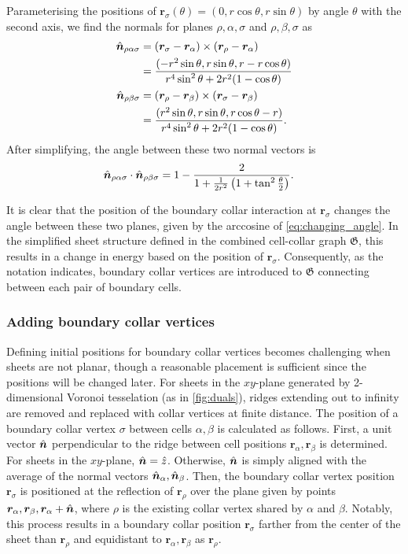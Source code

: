 Parameterising the positions of $\bm{r}_\sigma(\theta) = (0, r\cos\theta, r\sin\theta)$ by angle $\theta$ with the second axis, we find the normals for planes $\rho, \alpha, \sigma$ and $\rho, \beta, \sigma$ as 
\begin{align*}
	\hat{\bm{n}}_{\rho\alpha\sigma} &= (\bm{r}_\sigma - \bm{r}_\alpha) \times (\bm{r}_\rho - \bm{r}_\alpha) \\
	&= \frac{(-r^2 \sin\theta, r\sin\theta, r - r\cos\theta)}{r^4\sin^2\theta + 2r^2(1-\cos\theta)} \\
	\hat{\bm{n}}_{\rho\beta\sigma} &= (\bm{r}_{\rho} - \bm{r}_\beta) \times (\bm{r}_\sigma - \bm{r}_\beta)\\
	&= \frac{(r^2 \sin\theta, r\sin\theta, r\cos\theta - r)}{r^4\sin^2\theta + 2r^2(1-\cos\theta)}.
\end{align*}
\noindent After simplifying, the angle between these two normal vectors is 
\begin{align}
	\hat{\bm{n}}_{\rho\alpha\sigma} \cdot \hat{\bm{n}}_{\rho\beta\sigma} &= 1 - \frac{2}{1 + \frac{1}{2r^2} \left( 1 + \tan^2 \frac{\theta}{2}\right)}. \label{eq:changing_angle}
\end{align}

It is clear that the position of the boundary collar interaction at $\bm{r}_\sigma$ changes the angle between these two planes, given by the arccosine of \cref{eq:changing_angle}. 
In the simplified sheet structure defined in the combined cell-collar graph $\mathfrak{G}$, this results in a change in energy based on the position of $\bm{r}_\sigma$. 
Consequently, as the notation indicates, boundary collar vertices are introduced to $\mathfrak{G}$ connecting between each pair of boundary cells.

\subsubsection{Adding boundary collar vertices}

Defining initial positions for boundary collar vertices becomes challenging when sheets are not planar, though a reasonable placement is sufficient since the positions will be changed later. 
For sheets in the $xy$-plane generated by 2-dimensional Voronoi tesselation (as in \cref{fig:duals}), ridges extending out to infinity are removed and replaced with collar vertices at finite distance. 
The position of a boundary collar vertex $\sigma$ between cells $\alpha, \beta$ is calculated as follows. 
First, a unit vector $\hat{\bm{n}}$ perpendicular to the ridge between cell positions $\bm{r}_\alpha, \bm{r}_\beta$ is determined. 
For sheets in the $xy$-plane, $\hat{\bm{n}}=\hat{z}$. 
Otherwise, $\hat{\bm{n}}$ is simply aligned with the average of the normal vectors $\hat{\bm{n}}_\alpha, \hat{\bm{n}}_\beta$.
Then, the boundary collar vertex position $\bm{r}_\sigma$ is positioned at the reflection of $\bm{r}_\rho$ over the plane given by points $\bm{r}_\alpha, \bm{r}_\beta, \bm{r}_\alpha + \hat{\bm{n}}$, where $\rho$ is the existing collar vertex shared by $\alpha$ and $\beta$.
Notably, this process results in a boundary collar position $\bm{r}_\sigma$ farther from the center of the sheet than $\bm{r}_\rho$ and equidistant to $\bm{r}_\alpha, \bm{r}_\beta$ as $\bm{r}_\rho$. 

